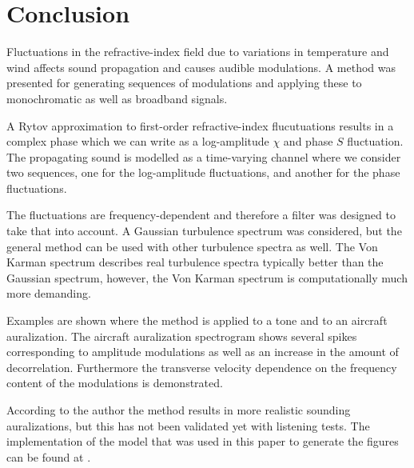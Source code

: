 \section{Conclusion}
Fluctuations in the refractive-index field due to variations in temperature and
wind affects sound propagation and causes audible modulations. A method was
presented for generating sequences of modulations and applying these to
monochromatic as well as broadband signals.

A Rytov approximation to first-order refractive-index flucutuations results in a complex
phase which we can write as a log-amplitude $\chi$ and phase $S$ fluctuation.
The propagating sound is modelled as a time-varying channel where we consider
two sequences, one for the log-amplitude fluctuations, and another for the phase
fluctuations.

The fluctuations are frequency-dependent and therefore a filter was designed to take that into account.
A Gaussian turbulence spectrum was considered, but the general method can be
used with other turbulence spectra as well. The Von Karman spectrum describes
real turbulence spectra typically better than the Gaussian spectrum, however,
the Von Karman spectrum is computationally much more demanding.

Examples are shown where the method is applied to a tone and to an aircraft
auralization. The aircraft auralization spectrogram shows several spikes
corresponding to amplitude modulations as well as an increase in the amount of
decorrelation. Furthermore the transverse velocity dependence on the frequency
content of the modulations is demonstrated.

According to the author the method results in more realistic sounding
auralizations, but this has not been validated yet with listening tests. The
implementation of the model that was used in this paper to generate the figures
can be found at \cite{Rietdijk2016}.
